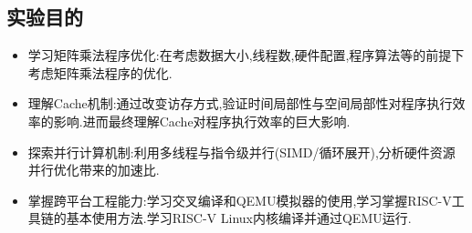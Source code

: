 \subsection{实验目的}
\begin{itemize}
    \item 学习矩阵乘法程序优化:在考虑数据大小,线程数,硬件配置,程序算法等的前提下考虑矩阵乘法程序的优化. 
    \item 理解Cache机制:通过改变访存方式,验证时间局部性与空间局部性对程序执行效率的影响.进而最终理解Cache对程序执行效率的巨大影响.
    \item 探索并行计算机制:利用多线程与指令级并行(SIMD/循环展开),分析硬件资源并行优化带来的加速比.
    \item 掌握跨平台工程能力:学习交叉编译和QEMU模拟器的使用,学习掌握RISC-V工具链的基本使用方法.学习RISC-V Linux内核编译并通过QEMU运行.
\end{itemize}